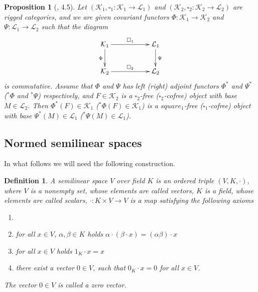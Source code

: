 \documentclass[12pt]{article}
\newtheorem{proposition}[theorem]{Proposition}
\newtheorem{definition}[theorem]{Definition}
\begin{document}
\begin{proposition}[\cite{HelMetrFrQmod}, 4.5]\label{PrFunctorMapFrToFr} 
Let $(\mathcal{K}_1, \square_1: \mathcal{K}_1 \to \mathcal{L}_1)$ and 
$(\mathcal{K}_2, \square_2 : \mathcal{K}_2 \to \mathcal{L}_2)$ are 
rigged categories, and we are given covariant functors 
$\Phi : \mathcal{K}_1 \to \mathcal{K}_2$ and 
$\Psi : \mathcal{L}_1 \to \mathcal{L}_2$ such that the diagram
$$
\xymatrix{{\mathcal{K}_1}\ar[d]_{\Phi} \ar[rr]^{\square_1} & &  %
{\mathcal{L}_1}\ar[d]^{\Psi}\\  %
{\mathcal{K}_2}\ar[rr]^{\square_2} & & {\mathcal{L}_2}}  %
$$
is commutative. Assume that $\Phi$ and $\Psi$ has left (right) adjoint 
functors $\Phi^*$ and $\Psi^*$ (${}^*\Phi$ and ${}^*\Psi$) respectively, 
and $F\in\mathcal{K}_2$ is a $\square_2$-free ($\square_2$-cofree) object 
with base $M\in\mathcal{L}_2$. Then 
$\Phi^*(F)\in\mathcal{K}_1$ (${}^*\Phi(F)\in\mathcal{K}_1$) is a 
$square_1$-free ($\square_1$-cofree) object with base 
$\Psi^*(M)\in\mathcal{L}_1$ (${}^*\Psi(M)\in\mathcal{L}_1$). 
\end{proposition}




























\subsection{Normed semilinear spaces}

In what follows we will need the following construction.

\begin{definition}\label{DefSemiLinSp} A semilinear space $V$ over field $K$ is 
an ordered triple $(V, K, \cdot)$, where $V$ is a nonempty set, whose elements 
are called vectors, $K$ is a field, whose elements are called scalars, 
$\cdot : K \times V \to V$ is a map satisfying the following axioms
\begin{enumerate}[label = (\roman*)]
    \item 
    \item for all $x\in V$, $\alpha,\beta\in K$ holds 
    $\alpha \cdot (\beta \cdot x) = (\alpha \beta) \cdot x $

    \item for all $x\in V$ holds $1_K \cdot x = x$

    \item there exist a vector $0 \in V$, such that $0_K \cdot x = 0$ 
    for all $x\in V$.
\end{enumerate}

The vector $0\in V$ is called a zero vector.
\end{definition}
\end{document}
